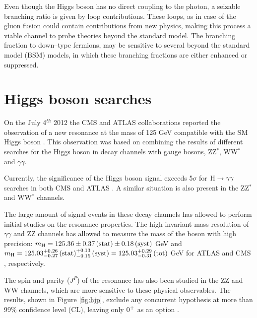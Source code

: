 Even though the Higgs boson has no direct coupling to the photon, a seizable branching ratio is given by loop contributions. These loops, as in case of the gluon fusion could contain contributions from new physics, making this process a viable channel to probe theories beyond the standard model. The branching fraction to down--type fermions, may be sensitive to several beyond the standard model (BSM) models, in which these branching fractions are either enhanced or suppressed.

\section{Higgs boson searches}
\label{sec:higgs_res}

On the July 4$^{th}$ 2012 the CMS and ATLAS collaborations reported the observation of a new resonance at the mass of 125 GeV compatible with the SM Higgs boson \cite{Chatrchyan:2013lba}. This observation was based on combining the results of different searches for the Higgs boson in decay channels with gauge bosons, ZZ$^\ast$, WW$^\ast$ and $\gamma\gamma$.

Currently, the significance of the Higgs boson signal exceeds 5$\sigma$ for $\mathrm{H}\rightarrow\gamma\gamma$ searches in both CMS and ATLAS \cite{Khachatryan:2014ira, ATLASCONF:2014009}. A similar situation is also present in the ZZ$^\ast$ and WW$^\ast$ channels.

The large amount of signal events in these decay channels has allowed to perform initial studies on the resonance properties. The high invariant mass resolution of $\gamma\gamma$ and ZZ channels has allowed to measure the mass of the boson with high precision: $m_{\mathrm{H}} = 125.36 \pm 0.37\, \mathrm{(stat)} \pm 0.18\, \mathrm{(syst)}$ GeV and $m_{\mathrm{H}} = 125.03^{+0.26}_{-0.27} \,\mathrm{(stat)}^{+0.13}_{-0.15}  \,\mathrm{(syst)} = 125.03^{+0.29}_{-0.31} \, \mathrm{(tot)}$ GeV for ATLAS \cite{Aad:2014aba} and CMS \cite{CMS:2014ega}, respectively.

The spin and parity ($J^P$) of the resonance has also been studied in the ZZ and WW channels, which are more sensitive to these physical observables. The results, shown in Figure \ref{fig:hjp}, exclude any concurrent hypothesis at more than 99\% confidence level (CL), leaving only $0^{+}$ as an option \cite{CMS:2014gga}.

